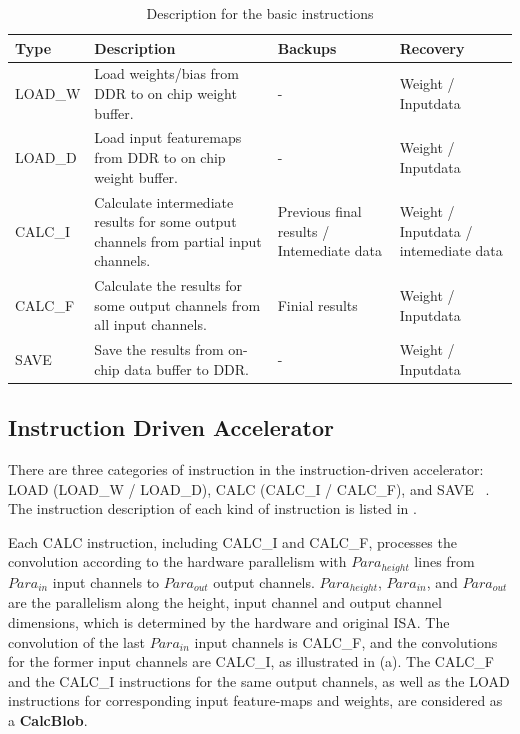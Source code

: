 \label{sec:cnninterrupt}


\begin{table}[t]
	\centering
	\scriptsize
	\caption{Description for the basic instructions}
\begin{tabular}{|p{4em}|p{12em}||p{6em}|p{6em}|}
	\hline
	Type  & Description & Backups & Recovery \bigstrut\\
	\hline
	LOAD\_W  & Load weights/bias from DDR to on chip weight buffer. & -     & Weight / Inputdata \bigstrut\\
	\hline
	LOAD\_D  & Load input featuremaps from DDR to on chip weight buffer. & -     & Weight / Inputdata \bigstrut\\
	\hline
	CALC\_I & Calculate intermediate results for some output channels from partial  input channels. & Previous final results / Intemediate data  & Weight / Inputdata /  intemediate data \bigstrut\\
	\hline
	CALC\_F & Calculate the results for some output channels from all input channels. & Finial results & Weight / Inputdata \bigstrut\\
	\hline
	SAVE  & Save the results from on-chip data buffer to DDR. & -     & Weight / Inputdata \bigstrut\\
	\hline
	\end{tabular}%
	
	\label{tab:instr}%
  \end{table}%
  




\subsection{ Instruction Driven Accelerator }
\label{sec:instrAcc}
There are three categories of instruction in the instruction-driven accelerator: LOAD (LOAD\_W / LOAD\_D), CALC (CALC\_I / CALC\_F), and SAVE  ~\cite{guo2017angel,qiu2016going,yu2018instruction}. The instruction description of each kind of instruction is listed in . 

Each CALC  instruction,  including CALC\_I and CALC\_F, processes the convolution according to the hardware parallelism with $Para_{height}$ lines from $ Para_{in} $ input channels to $ Para_{out}$ output channels. $Para_{height}$, $ Para_{in} $, and $ Para_{out} $ are the parallelism along the height, input channel and output channel dimensions, which is determined by the hardware and original ISA. The convolution of the last $ Para_{in} $ input channels is CALC\_F, and the convolutions for the former input channels are CALC\_I, as illustrated in (a). The CALC\_F and the CALC\_I instructions for the same output channels, as well as the LOAD instructions for corresponding input feature-maps and weights, are considered as a \textbf{CalcBlob}.


